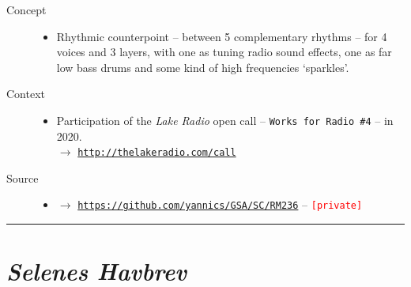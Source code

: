 \begin{description}
\item[Concept] \hfill 
\begin{itemize}
\item[] Rhythmic counterpoint -- between 5 complementary rhythms -- for 4 voices and 3 layers, with one as tuning radio sound effects, one as far low bass drums and some kind of high frequencies `sparkles'.
\end{itemize}
\bigskip
\item[Context] \hfill 
\begin{itemize}
\item[] Participation of the \textit{Lake Radio} open call -- \texttt{Works for Radio \#4} -- in 2020. \\
$\rightarrow$ \href{http://thelakeradio.com/call}{\texttt{\small http://thelakeradio.com/call}}
\end{itemize}
\bigskip
\bigskip
\item[Source] \hfill 
\begin{itemize}
\item[] $\rightarrow$ \href{https://github.com/yannics/GSA/SC/RM236}{\texttt{\small https://github.com/yannics/GSA/SC/RM236}}  -- \texttt{\textcolor{red}{\small[private]}}
\end{itemize}
\end{description}

\bigskip

\begin{center}\rule{0.5\linewidth}{0.5pt}\end{center}

\bigskip

\section*{\textsl{Selenes Havbrev}}


\bigskip

